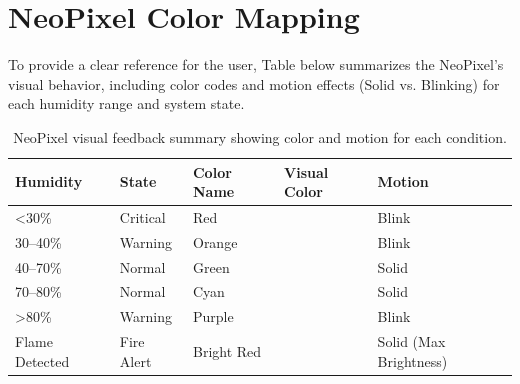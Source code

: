 \section{NeoPixel Color Mapping}

To provide a clear reference for the user, Table below summarizes the NeoPixel's visual behavior, including color codes and motion effects (Solid vs. Blinking) for each humidity range and system state.

\begin{table}[H]
\centering
\caption{NeoPixel visual feedback summary showing color and motion for each condition.}
\label{tab:neopixel_visual}
\begin{tabular}{|l|l|l|l|l|}
\hline
\textbf{Humidity} & \textbf{State} & \textbf{Color Name} & \textbf{Visual Color} & \textbf{Motion} \\
\hline
\textless 30\% & Critical & Red & \cellcolor{red} & Blink \\
\hline
30--40\% & Warning & Orange & \cellcolor{orange} & Blink \\
\hline
40--70\% & Normal & Green & \cellcolor{green} & Solid \\
\hline
70--80\% & Normal & Cyan & \cellcolor{cyan} & Solid \\
\hline
\textgreater 80\% & Warning & Purple & \cellcolor{violet} & Blink \\
\hline
Flame Detected & Fire Alert & Bright Red & \cellcolor{red} & Solid (Max Brightness) \\
\hline
\end{tabular}
\end{table}

